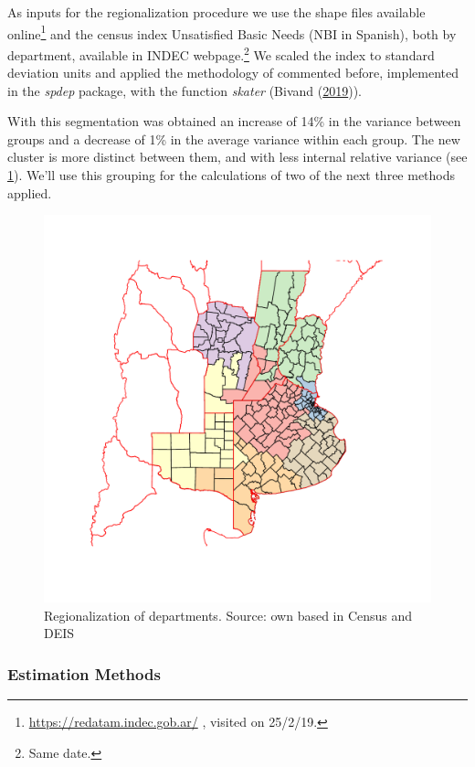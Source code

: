 \documentclass[12pt,]{article}
\begin{document}
As inputs for the regionalization procedure we use the shape files
available online\footnote{\url{https://redatam.indec.gob.ar/} , visited
  on 25/2/19.} and the census index Unsatisfied Basic Needs (NBI in
Spanish), both by department, available in INDEC webpage.\footnote{Same
  date.} We scaled the index to standard deviation units and applied the
methodology of commented before, implemented in the \emph{spdep}
package, with the function \emph{skater} (Bivand
(\protect\hyperlink{ref-Bivand2019}{2019})).

With this segmentation was obtained an increase of 14\% in the variance
between groups and a decrease of 1\% in the average variance within each
group. The new cluster is more distinct between them, and with less
internal relative variance (see \ref{fig:cluster}). We'll use this
grouping for the calculations of two of the next three methods applied.

\begin{figure}

{\centering \includegraphics[width=0.7\linewidth]{analysis/plots/cluster} 

}

\caption{Regionalization of departments. Source: own based in Census and DEIS}\label{fig:cluster}
\end{figure}

\hypertarget{estimation-methods}{%
\subsubsection{\texorpdfstring{\textbf{Estimation
Methods}}{Estimation Methods}}\label{estimation-methods}}
\end{document}
